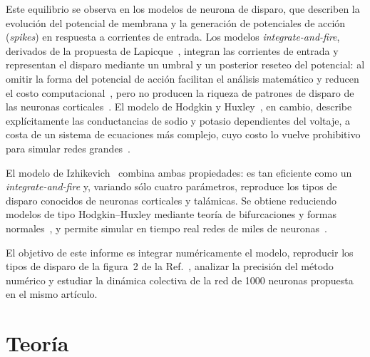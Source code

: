 \documentclass[10pt,a4paper,twocolumn]{article}
\begin{document}
Este equilibrio se observa en los modelos de neurona de disparo, que describen la
evolución del potencial de membrana y la generación de potenciales de acción
(\emph{spikes}) en respuesta a corrientes de entrada. Los modelos
\emph{integrate-and-fire}, derivados de la propuesta de Lapicque~\cite{lapicque1907},
integran las corrientes de entrada y representan el disparo mediante un umbral y un
posterior reseteo del potencial: al omitir la forma del potencial de acción facilitan
el análisis matemático y reducen el costo computacional~\cite{dayan2001}, pero no
producen la riqueza de patrones de disparo de las neuronas
corticales~\cite{izhikevich2003}. El modelo de Hodgkin y Huxley~\cite{hodgkin1952},
en cambio, describe explícitamente las conductancias de sodio y potasio dependientes
del voltaje, a costa de un sistema de ecuaciones más complejo, cuyo costo lo vuelve
prohibitivo para simular redes grandes~\cite{izhikevich2003}.

El modelo de Izhikevich~\cite{izhikevich2003,izhikevich2007} combina ambas
propiedades: es tan eficiente como un \emph{integrate-and-fire} y, variando sólo
cuatro parámetros, reproduce los tipos de disparo conocidos de neuronas corticales y
talámicas. Se obtiene reduciendo modelos de tipo Hodgkin--Huxley mediante teoría de
bifurcaciones y formas normales~\cite{izhikevich2003,izhikevich2007}, y permite
simular en tiempo real redes de miles de neuronas~\cite{izhikevich2003}.

El objetivo de este informe es integrar numéricamente el modelo, reproducir los tipos
de disparo de la figura~2 de la Ref.~\cite{izhikevich2003}, analizar la precisión del
método numérico y estudiar la dinámica colectiva de la red de 1000 neuronas propuesta
en el mismo artículo.

\section{Teoría}
\end{document}
